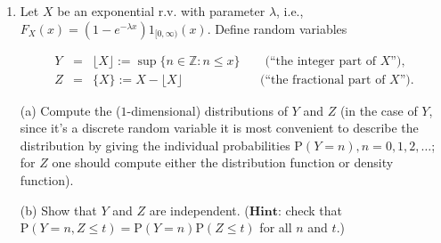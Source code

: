 \begin{enumerate}[label=\arabic*.]
\[
R_n(x) = \begin{cases} 0 & 0 \le \{ 2^{n-1} x \} < 1/2, \\ 1 &
1/2 \le \{ 2^{n-1} x \} < 1. \end{cases}
\]

\noindent For any $n\in \mathbb{N}$ and
$a_1, a_2, \ldots, a_n \in \{0,1\}$, denote by
$B_n(a_1,\ldots,a_n)$ the set

\[
B_n(a_1,\ldots,a_n) = \{ x \in (0,1) : R_1(x)=a_1, R_2(x)=a_2, \ldots, R_n(x) = a_n \}.
\]

\noindent Find a good explicit description for this set (``the
set of all $x$'s such that ...''), and deduce from it
that

\[
\mathrm{P}(B_n(a_1,\ldots,a_n)) = \frac{1}{2^n}.
\]

\noindent (c) Define a function
$f:(0,1) \to \{0,1\}^{\mathbb{N}}$ by

\[
f(x) = (R_1(x), R_2(x), R_3(x), \ldots).
\]

\noindent Prove that $f$ is a measurable function when the
space $\{0,1\}^{\mathbb{N}}$ is equipped with the
$\sigma$-algebra generated by the sets

\[
A_n(1) = \{ (x_1,x_2,\ldots) \in \{0,1\}^{\mathbb{N}} : x_n = 1 \}.
\]

\noindent (d) Prove that the push-forward of Lebesgue measure
under $f$ is the probability measure corresponding to
the random experiment of an infinite sequence of fair
coin tosses.

\item Let $X$ be an exponential r.v. with parameter
$\lambda$, i.e.,
$F_X(x)=(1-e^{-\lambda x}) 1_{[0,\infty)}(x)$. Define
random variables

\begin{eqnarray*}
Y &=& \lfloor X \rfloor := \sup \{ n\in \mathbb{Z} : n \le x \} \qquad\textrm{(``the integer part of $X$'')}, \\
Z &=& \{ X \} := X-\lfloor X \rfloor \qquad \qquad\ \qquad\textrm{(``the fractional part of $X$'')}.
\end{eqnarray*}

\noindent (a) Compute the ($1$-dimensional) distributions of $Y$
and $Z$ (in the case of $Y$, since it's a discrete
random variable it is most convenient to describe the
distribution by giving the individual probabilities
$\mathrm{P}(Y=n), n=0,1,2,\ldots$; for $Z$ one should
compute either the distribution function or density
function).

(b) Show that $Y$ and $Z$ are independent.
($\textbf{Hint:}$ check that
$\mathrm{P}(Y=n, Z\le
t)=\mathrm{P}(Y=n)\mathrm{P}(Z\le t)$
for all $n$ and $t$.)


\end{enumerate}
